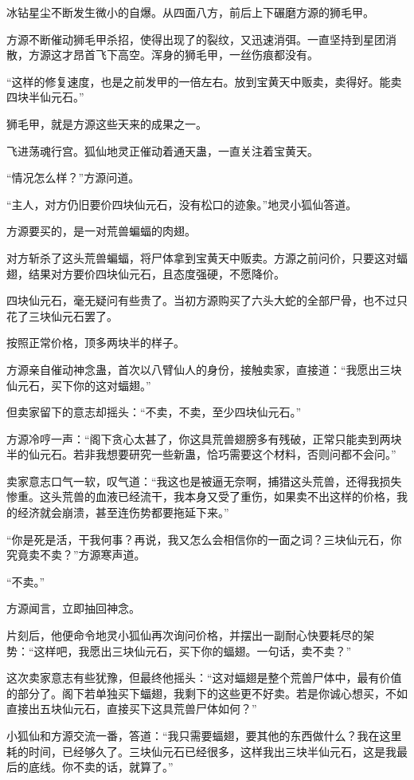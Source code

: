 \begin{this_body}
冰钻星尘不断发生微小的自爆。从四面八方，前后上下碾磨方源的狮毛甲。

方源不断催动狮毛甲杀招，使得出现了的裂纹，又迅速消弭。一直坚持到星团消散，方源这才昂首飞下高空。浑身的狮毛甲，一丝伤痕都没有。

“这样的修复速度，也是之前发甲的一倍左右。放到宝黄天中贩卖，卖得好。能卖四块半仙元石。”

狮毛甲，就是方源这些天来的成果之一。

飞进荡魂行宫。狐仙地灵正催动着通天蛊，一直关注着宝黄天。

“情况怎么样？”方源问道。

“主人，对方仍旧要价四块仙元石，没有松口的迹象。”地灵小狐仙答道。

方源要买的，是一对荒兽蝙蝠的肉翅。

对方斩杀了这头荒兽蝙蝠，将尸体拿到宝黄天中贩卖。方源之前问价，只要这对蝠翅，结果对方要价四块仙元石，且态度强硬，不愿降价。

四块仙元石，毫无疑问有些贵了。当初方源购买了六头大蛇的全部尸骨，也不过只花了三块仙元石罢了。

按照正常价格，顶多两块半的样子。

方源亲自催动神念蛊，首次以八臂仙人的身份，接触卖家，直接道：“我愿出三块仙元石，买下你的这对蝠翅。”

但卖家留下的意志却摇头：“不卖，不卖，至少四块仙元石。”

方源冷哼一声：“阁下贪心太甚了，你这具荒兽翅膀多有残破，正常只能卖到两块半的仙元石。若非我想要研究一些新蛊，恰巧需要这个材料，否则问都不会问。”

卖家意志口气一软，叹气道：“我这也是被逼无奈啊，捕猎这头荒兽，还得我损失惨重。这头荒兽的血液已经流干，我本身又受了重伤，如果卖不出这样的价格，我的经济就会崩溃，甚至连伤势都要拖延下来。”

“你是死是活，干我何事？再说，我又怎么会相信你的一面之词？三块仙元石，你究竟卖不卖？”方源寒声道。

“不卖。”

方源闻言，立即抽回神念。

片刻后，他便命令地灵小狐仙再次询问价格，并摆出一副耐心快要耗尽的架势：“这样吧，我愿出三块仙元石，买下你的蝠翅。一句话，卖不卖？”

这次卖家意志有些犹豫，但最终他摇头：“这对蝠翅是整个荒兽尸体中，最有价值的部分了。阁下若单独买下蝠翅，我剩下的这些更不好卖。若是你诚心想买，不如直接出五块仙元石，直接买下这具荒兽尸体如何？”

小狐仙和方源交流一番，答道：“我只需要蝠翅，要其他的东西做什么？我在这里耗的时间，已经够久了。三块仙元石已经很多，这样我出三块半仙元石，这是我最后的底线。你不卖的话，就算了。”


\end{this_body}
